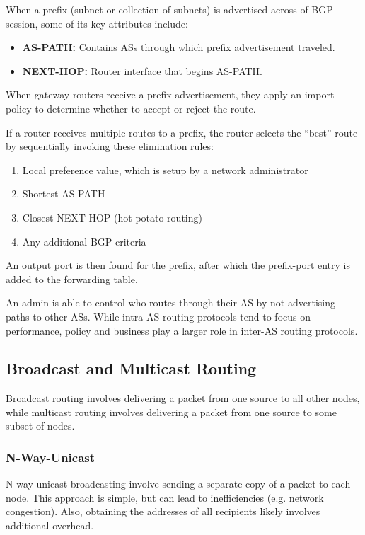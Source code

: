 \documentclass[12pt,titlepage]{article}
\begin{document}
        When a prefix (subnet or collection of subnets) is advertised across of BGP session, some of its key attributes include:
        \begin{itemize}
          \item \textbf{AS-PATH:} Contains ASs through which prefix advertisement traveled.
          \item \textbf{NEXT-HOP:} Router interface that begins AS-PATH.
        \end{itemize}
        When gateway routers receive a prefix advertisement, they apply an import policy to determine whether to accept or reject the route.

        If a router receives multiple routes to a prefix, the router selects the ``best'' route by sequentially invoking these elimination rules:
        \begin{enumerate}
          \item Local preference value, which is setup by a network administrator
          \item Shortest AS-PATH
          \item Closest NEXT-HOP (hot-potato routing)
          \item Any additional BGP criteria
        \end{enumerate}
        An output port is then found for the prefix, after which the prefix-port entry is added to the forwarding table.

        An admin is able to control who routes through their AS by not advertising paths to other ASs. While intra-AS routing protocols tend to
        focus on performance, policy and business play a larger role in inter-AS routing protocols.

    \subsection{Broadcast and Multicast Routing}
      Broadcast routing involves delivering a packet from one source to all other nodes, while multicast routing involves delivering a packet from
      one source to some subset of nodes.

      \subsubsection{N-Way-Unicast}
        N-way-unicast broadcasting involve sending a separate copy of a packet to each node. This approach is simple, but can lead to inefficiencies
        (e.g. network congestion). Also, obtaining the addresses of all recipients likely involves additional overhead.
\end{document}
